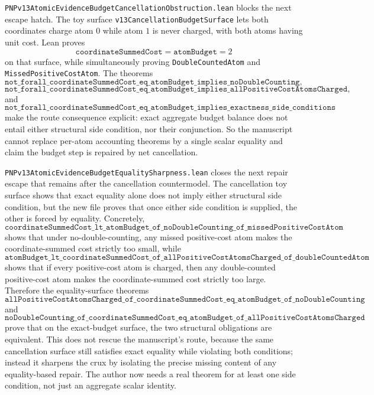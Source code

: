 \documentclass[11pt]{article}
\theoremstyle{remark}
\begin{document}
\texttt{PNPv13AtomicEvidenceBudgetCancellationObstruction.lean} blocks the next
escape hatch.  The toy surface \texttt{v13CancellationBudgetSurface} lets both
coordinates charge atom \(0\) while atom \(1\) is never charged, with both
atoms having unit cost.  Lean proves
\[
  \texttt{coordinateSummedCost}=\texttt{atomBudget}=2
\]
on that surface, while simultaneously proving
\texttt{DoubleCountedAtom} and \texttt{MissedPositiveCostAtom}.  The theorems
\[
  \texttt{not\_forall\_coordinateSummedCost\_eq\_atomBudget\_implies\_noDoubleCounting},
\]
\[
  \texttt{not\_forall\_coordinateSummedCost\_eq\_atomBudget\_implies\_allPositiveCostAtomsCharged},
\]
and
\[
  \texttt{not\_forall\_coordinateSummedCost\_eq\_atomBudget\_implies\_exactness\_side\_conditions}
\]
make the route consequence explicit: exact aggregate budget balance does not
entail either structural side condition, nor their conjunction.  So the
manuscript cannot replace per-atom accounting theorems by a single scalar
equality and claim the budget step is repaired by net cancellation.

\texttt{PNPv13AtomicEvidenceBudgetEqualitySharpness.lean} closes the next repair
escape that remains after the cancellation countermodel.  The cancellation toy
surface shows that exact equality alone does not imply either structural side
condition, but the new file proves that once either side condition is supplied,
the other is forced by equality.  Concretely,
\[
  \texttt{coordinateSummedCost\_lt\_atomBudget\_of\_noDoubleCounting\_of\_missedPositiveCostAtom}
\]
shows that under no-double-counting, any missed positive-cost atom makes the
coordinate-summed cost strictly too small, while
\[
  \texttt{atomBudget\_lt\_coordinateSummedCost\_of\_allPositiveCostAtomsCharged\_of\_doubleCountedAtom}
\]
shows that if every positive-cost atom is charged, then any double-counted
positive-cost atom makes the coordinate-summed cost strictly too large.
Therefore the equality-surface theorems
\[
  \texttt{allPositiveCostAtomsCharged\_of\_coordinateSummedCost\_eq\_atomBudget\_of\_noDoubleCounting}
\]
and
\[
  \texttt{noDoubleCounting\_of\_coordinateSummedCost\_eq\_atomBudget\_of\_allPositiveCostAtomsCharged}
\]
prove that on the exact-budget surface, the two structural obligations are
equivalent.  This does not rescue the manuscript's route, because the same
cancellation surface still satisfies exact equality while violating both
conditions; instead it sharpens the crux by isolating the precise missing
content of any equality-based repair.  The author now needs a real theorem for
at least one side condition, not just an aggregate scalar identity.
\end{document}
